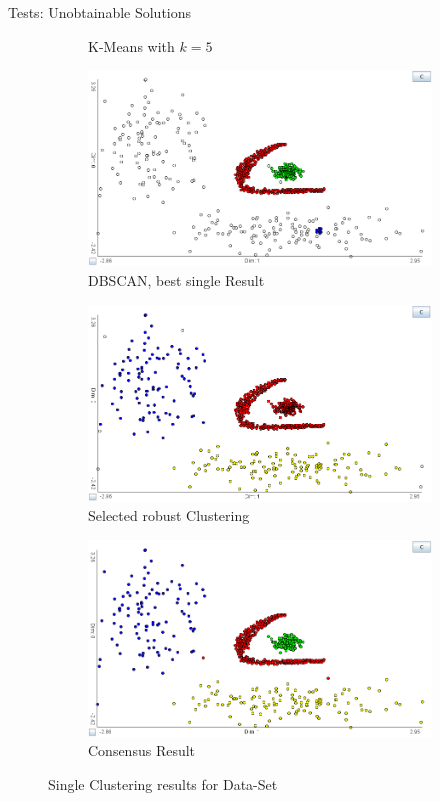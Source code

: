 \documentclass[aspectratio=169]{beamer}
\begin{document}
\begin{frame}{Tests: Unobtainable Solutions}
\begin{figure}[h]
\begin{subfigure}[t]{.32\textwidth}
		  \caption{K-Means with $k=5$}
		  \label{fig:unob_k5ex}
	\end{subfigure}
	\begin{subfigure}[t]{.32\textwidth}
		  \centering
		  \includegraphics[width=.99\linewidth]{unob_best}
		  \caption{DBSCAN, best single Result}
		  \label{fig:unob_best}
	\end{subfigure}
	\begin{subfigure}[t]{.32\textwidth}
		\centering
		\includegraphics[width=.99\linewidth]{unob_stable}
		\caption{Selected robust Clustering}
		\label{fig:unob_stable}
	\end{subfigure}
	\begin{subfigure}[t]{.32\textwidth}
		\centering
		\includegraphics[width=.99\linewidth]{unob_consensus}
		\caption{Consensus Result}
		\label{fig:unob_consensus}
	\end{subfigure}	
	\caption{Single Clustering results for Data-Set}
	\label{fig:single}
	\end{figure}
\end{frame}
\end{document}
